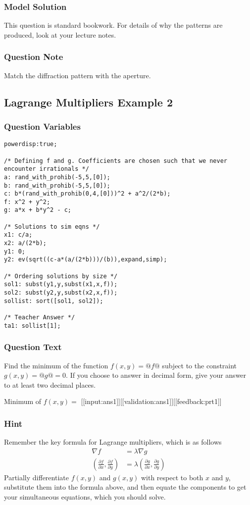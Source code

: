 \documentclass[a4paper,10pt]{article}
\begin{document}
\subsubsection{Model Solution}
This question is standard bookwork. For details of why the patterns are produced, look at your lecture notes.
\subsubsection{Question Note}
Match the diffraction pattern with the aperture.

\subsection{Lagrange Multipliers Example 2}
\subsubsection{Question Variables}
\begin{lstlisting}
powerdisp:true;

/* Defining f and g. Coefficients are chosen such that we never encounter irrationals */
a: rand_with_prohib(-5,5,[0]);
b: rand_with_prohib(-5,5,[0]);
c: b*(rand_with_prohib(0,4,[0]))^2 + a^2/(2*b);
f: x^2 + y^2;
g: a*x + b*y^2 - c;

/* Solutions to sim eqns */
x1: c/a;
x2: a/(2*b);
y1: 0;
y2: ev(sqrt((c-a*(a/(2*b)))/(b)),expand,simp);

/* Ordering solutions by size */
sol1: subst(y1,y,subst(x1,x,f));
sol2: subst(y2,y,subst(x2,x,f));
sollist: sort([sol1, sol2]);

/* Teacher Answer */
ta1: sollist[1];
\end{lstlisting}
\subsubsection{Question Text}
Find the minimum of the function \(f(x,y) = @f@\) subject to the constraint \(g(x,y) = @g@ = 0\). If you choose to answer in decimal form, give your answer to at least two decimal places.

Minimum of \(f(x,y) = \) [[input:ans1]][[validation:ans1]][[feedback:prt1]]
\subsubsection{Hint}
Remember the key formula for Lagrange multipliers, which is as follows \begin{align*} \nabla f &= \lambda \nabla g \\ \left(\frac{\partial f}{\partial x},\frac{\partial f}{\partial y} \right) &= \lambda \left( \frac{\partial g}{\partial x}, \frac{\partial g}{\partial y} \right) \end{align*} Partially differentiate \(f(x,y)\) and \(g(x,y)\) with respect to both \(x\) and \(y\), substitute them into the formula above, and then equate the components to get your simultaneous equations, which you should solve.
\end{document}
